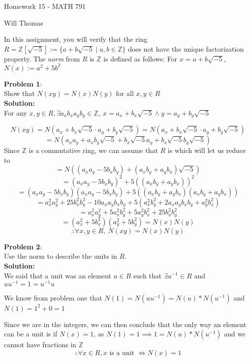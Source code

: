\documentclass[11pt]{article}
\newcommand{\prob}[3]{\begin{flushleft}
        \textbf{Problem #1}: \\
        #2 
		\textbf{Solution:} 
		#3

\end{flushleft}}
\newcommand{\makeHWtitle}[1]{
    \begin{center}
    \Large{Homework #1 - MATH 791} 
        \vspace{5pt}
        
        \normalsize{Will Thomas}
        \vspace{5pt}
    \end{center}
}
\begin{document}
\makeHWtitle{15}

In this assignment, you will verify that the ring $R = \mathbb{Z}[\sqrt{-5}] := \{ a + b\sqrt{-5} \mid a, b \in \mathbb{Z} \}$
does not have the unique factorization property. The \emph{norm} from $R$ is $\mathbb{Z}$ is defined as follows: For $x = a + b\sqrt{-5}$,
$N(x) := a^2 + 5b^2$

\prob{1}{
    Show that $N(xy) = N(x) N(y)$ for all $x, y \in R$ \\
}{ \\
    For any $x, y \in R, \exists a_x b_x a_y b_y \in \mathbb{Z},\ x = a_x + b_x\sqrt{-5} \land y = a_y + b_y\sqrt{-5}$

    $$N(xy) = N(a_x + b_x\sqrt{-5} \cdot a_y + b_y\sqrt{-5}) = N(a_x + b_x\sqrt{-5} \cdot a_y + b_y\sqrt{-5})$$
    $$= N(a_x a_y + a_x b_y\sqrt{-5} + b_x\sqrt{-5}a_y + b_x\sqrt{-5} b_y \sqrt{-5})$$
    Since $\mathbb{Z}$ is a commutative ring, we can assume that $R$ is which will let us reduce to
    $$= N((a_x a_y - 5b_xb_y) + (a_x b_y + a_y b_x)\sqrt{-5})$$
    $$= (a_x a_y - 5b_xb_y)^2 + 5((a_x b_y + a_y b_x))^2$$
    $$= (a_x a_y - 5b_xb_y)(a_x a_y - 5b_xb_y) + 5((a_x b_y + a_y b_x)(a_x b_y + a_y b_x))$$
    $$= a_x^2 a_y^2 + 25 b_x^2 b_y^2 - 10 a_x a_y b_x b_y + 5(a_x^2 b_y^2 + 2 a_x a_y b_x b_y + a_y^2 b_x^2)$$
    $$= a_x^2 a_y^2 + 5a_x^2 b_y^2 + 5a_y^2 b_x^2 + 25 b_x^2 b_y^2$$
    $$= (a_x^2 + 5 b_x^2)(a_y^2 + 5 b_y^2) = N(x) N(y)$$
    $$\therefore \forall x, y \in R,\ N(xy) = N(x)N(y)$$
}

\prob{2}{
    Use the norm to describe the units in $R$. \\
}{ \\
    We said that a unit was an element $u \in R$ such that $\exists u^{-1} \in R$ and $uu^{-1} = 1 = u^{-1}u$

    We know from problem one that $N(1) = N(uu^{-1}) = N(u)*N(u^{-1})$ and $N(1) = 1^2 + 0 = 1$

    Since we are in the integers, we can then conclude that the only way an element can be a unit is if $N(x) = 1$, as $N(1) = 1 \implies 1 = N(u)*N(u^{-1})$ and we cannot have fractions in $\mathbb{Z}$
    $$\therefore \forall x \in R, \text{$x$ is a unit $\iff N(x) = 1$}$$
}
\end{document}
